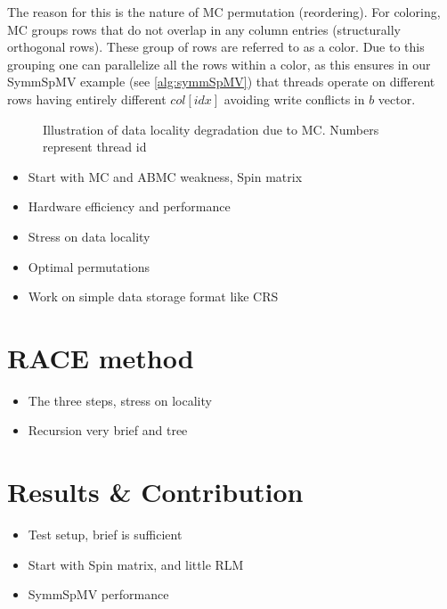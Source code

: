  The reason for this is the nature of \acrlong{MC} 
permutation (reordering). For \DTWO coloring, \acrshort{MC}
groups rows that do not overlap in any column entries \cite{dist_k_def} 
(structurally orthogonal rows). These group of rows are referred to as
a color. Due to this grouping one can parallelize all the rows within a color, 
as this ensures in our \acrshort{SymmSpMV} example (see \cref{alg:symmSpMV})
that threads operate on different rows having entirely different 
$col[idx]$ avoiding write conflicts in $b$ vector.

\begin{figure}[b]
	\centering
	\hspace{0.5em}
	\caption{Illustration of data locality degradation due to \acrshort{MC}.
		Numbers represent thread id}
\end{figure}

\begin{itemize}
	\item Start with MC and ABMC weakness, Spin matrix
	\item Hardware efficiency and performance
	\item Stress on data locality
	\item Optimal permutations
	\item Work on simple data storage format like \acrshort{CRS}
\end{itemize}


\section{RACE method}
\begin{itemize}
	\item The three steps, stress on locality
	\item Recursion very brief and tree
\end{itemize}


\section{Results \& Contribution} \label{sec:results}
\begin{itemize}
	\item Test setup, brief is sufficient
	\item Start with Spin matrix, and little RLM
	\item SymmSpMV performance
\end{itemize}
